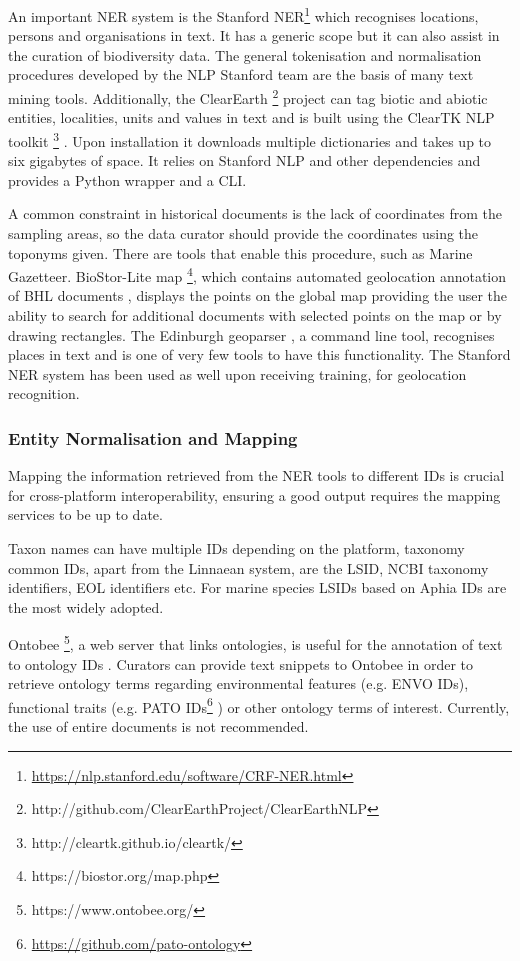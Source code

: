 An important NER system is the Stanford NER\footnote{\url{https://nlp.stanford.edu/software/CRF-NER.html}}
\citep{finkel_incorporating_2005} which recognises locations, persons and
organisations in text. It has a generic scope but it can also assist in the
curation of biodiversity data. The general tokenisation and normalisation
procedures developed by the NLP Stanford team are the basis of many text mining
tools. Additionally, the ClearEarth \footnote{http://github.com/ClearEarthProject/ClearEarthNLP}
project \citep{thessen_automated_2018} can tag biotic and abiotic entities,
localities, units and values in text and is built using the ClearTK NLP
toolkit \footnote{http://cleartk.github.io/cleartk/} \citep{bethard_cleartk_2014}.
Upon installation it downloads multiple dictionaries and takes up to six
gigabytes of space. It relies on Stanford NLP and other dependencies and
provides a Python wrapper and a CLI.

A common constraint in historical documents is the lack of coordinates from the
sampling areas, so the data curator should provide the coordinates using the
toponyms given. There are tools that enable this procedure, such as Marine
Gazetteer. BioStor-Lite map \footnote{https://biostor.org/map.php}, which
contains automated geolocation annotation of BHL documents
\citep{page_text-mining_2019}, displays the points on the global map providing
the user the ability to search for additional documents with selected points on
the map or by drawing rectangles. The Edinburgh geoparser
\citep{alex_adapting_2015}, a command line tool, recognises places in text and
is one of very few tools to have this functionality. The Stanford NER system
has been used as well \citep{stahlman_geoparsing_2019} upon receiving training,
for geolocation recognition.

   \subsubsection{Entity Normalisation and Mapping}
   Mapping the information retrieved from the NER tools to different IDs is
crucial for cross-platform interoperability, ensuring a good output requires
the mapping services to be up to date.

Taxon names can have multiple IDs depending on the platform, taxonomy common
IDs, apart from the Linnaean system, are the LSID, NCBI taxonomy identifiers,
EOL identifiers etc. For marine species LSIDs based on Aphia IDs are the most
widely adopted.

Ontobee \footnote{https://www.ontobee.org/}, a web server that links
ontologies, is useful for the annotation of text to ontology IDs
\citep{xiang_ontobee_2011}. Curators can provide text snippets to Ontobee in
order to retrieve ontology terms regarding environmental features (e.g. ENVO
IDs), functional traits (e.g. PATO
IDs\footnote{\url{https://github.com/pato-ontology}} \citep{tan_pato-ontologypato_2022})
or other ontology terms of interest. Currently, the use of entire documents is
not recommended.

